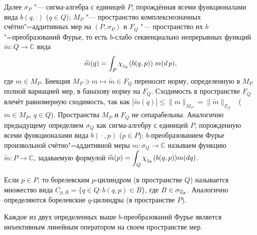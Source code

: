  Далее
 $\sigma _P$ "---
 сигма-алгебра с единицей $P$,
 порождённая всеми  функционалами вида
  $  b(q, {\cdot}) $
 ($q\in Q$);
 $M_P$ "--- пространство комплекснозначных  счётно"=аддитивных мер на  $(P,\sigma _P)$ и $F_Q$ "--- пространство их $b$"=преобразований Фурье, то есть  $b$-слабо секвенциально непрерывных  функций
 $
 \widetilde m : Q \to \mathbb C  $ вида
$$
 \widetilde m(q)=\int_P \chi_{{}_{\mathbb Q_{\mathfrak p}}}(b(q,p))\;m(d\,p),$$ где
 $m\in M_P$.
 Биекция $M_P\ni m\mapsto\widetilde m\in F_Q$ переносит норму, определенную в $M_P$
 полной вариацией мер, в банахову норму на $F_Q$.
 Сходимость в пространстве $F_Q$ влечёт равномерную сходимость,
 так как $|\widetilde m(q)|\leqslant \|m\|_{M_P}=\|\widetilde m\|_{F_Q}$ \ ($m\in M_P$, $q\in Q$).
  Пространства $M_P$ и $F_Q$ не сепарабельны.
 Аналогично предыдущему определяем $\sigma _Q$
 как
   сигма-алгебру с единицей $P$,
   порожденную
 всеми функционалами вида
 $
  b({} \cdot {}, p)
 $
  ($p\in P$);
 $b$-преобразованием Фурье
 произвольной  счётно"=аддитивной меры
 $m:\sigma _Q\to\mathbb C$
 называем функцию $\widetilde m:P\to\mathbb C$,
 задаваемую формулой
 $\displaystyle \widetilde m(p)=\int_Q \chi_{{}_{\mathbb Q_{{\mathfrak p}}}}(b(q,p))m(dq)$.



 Если $p\in P$,
 то борелевским $p$-цилиндром (в пространстве $Q$)
  называется множество вида
 $
 C_{p,B}=\{q\in Q: b(q,p) %
 \in B\}
 $,
 где $B\in\sigma _{\mathbb Q_{\mathfrak p}}$.
  Аналогично определяются борелевские $q$-цилиндры (в пространстве $P$).

\smallskip

\hypertarget{sham:th:1}{}

 \begin{theorem}[1] %
 Каждое из двух определенных выше $b$-преобразований Фурье
 является инъективным линейным оператором
 на своем пространстве мер.
 \end{theorem} %

\smallskip

